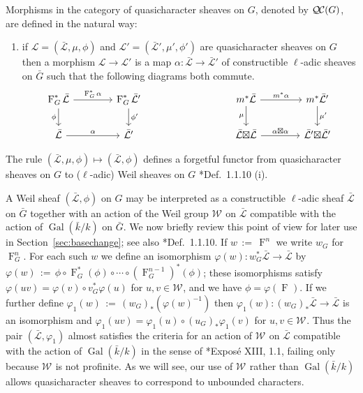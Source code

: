 \documentclass[11pt]{amsart}
\makeatletter
\theoremstyle{plain}
\theoremstyle{definition}
\theoremstyle{remark}
\newcommand{\bFq}{\bar{k}}
\newcommand{\Fq}{k}
\DeclareMathOperator{\Gal}{Gal}
\newcommand{\Frob}[1]{\operatorname{F}_{#1}}
\newcommand{\ceq}{{\, :=\, }}
\newcommand{\qcs}[1]{{\mathcal{#1}}}
\newcommand{\gqcs}[1]{{\mathcal{\bar #1}}}
\newcommand{\QC}{{\mathcal{Q\hskip-0.8pt C}}}
\newcommand{\Weil}[1]{\mathcal{W}_{#1}}
\newcommand{\labitem}[2]{%
\def\@itemlabel{\textbf{#1}}
\item
\def\@currentlabel{#1}\label{#2}}
\newcommand{\bG}{\bar{G}}
\newcommand{\tight}[3]{\hspace{-#1pt}{#2}\hspace{-#3pt}}
\newcommand{\LxL}{\text{$\gqcs{L} \tight{0}{\boxtimes}{0} \gqcs{L}$}}
\newcommand\Clifton[1]{\marginpar{\smaller\smaller CC: #1}}
\makeatother
\begin{document}
Morphisms in the category of quasicharacter sheaves on $G$, denoted by $\QC(G)$, are defined in the natural way:
\begin{enumerate}
\labitem{(QC.4)}{QC.4} if $\qcs{L} = (\gqcs{L},\mu,\phi)$ and
  $\qcs{L'} = (\gqcs{L'},\mu',\phi')$ are quasicharacter sheaves on $G$ then
  a morphism $\qcs{L} \to \qcs{L}'$ is a map $\alpha : \gqcs{L} \to \gqcs{L'}$
  of constructible $\ell$-adic sheaves on $\bG$ such that the following diagrams both commute.
  \[
  \begin{tikzcd}[column sep=40]
  \Frob{G}^* \gqcs{L} \rar{\Frob{G}^* \alpha} \arrow[swap]{d}{\phi} & \Frob{G}^* \gqcs{L'} \dar{\phi'}
  & %
  & \arrow[swap]{d}{\mu} m^* \gqcs{L} \rar{m^* \alpha} & m^* \gqcs{L'} \dar{\mu'} \\
  \gqcs{L} \rar{\alpha} & \gqcs{L'}
  & {} & \LxL \rar{\tight{1}{\alpha\boxtimes \alpha}{1}} & \gqcs{L'} \tight{0}{\boxtimes}{0} \gqcs{L'}
  \end{tikzcd}
  \]
\end{enumerate}

The rule $(\gqcs{L},\mu,\phi) \mapsto (\gqcs{L},\phi)$ defines a forgetful functor from quasicharacter
sheaves on $G$ to ($\ell$-adic) Weil sheaves on $G$ \cite{deligne:80a}*{Def.~1.1.10 (i)}.

A Weil sheaf $(\gqcs{L},\phi)$ on $G$
may be interpreted as a constructible $\ell$-adic sheaf $\gqcs{L}$ on $\bG$ together with
an action of the Weil group $\Weil{}$ on $\gqcs{L}$ compatible with the action of
$\Gal(\bFq/\Fq)$ on $\bG$. We now briefly review this point of view for later use in
Section~\ref{sec:basechange}; see also \cite{deligne:80a}*{Def.~1.1.10}.  If $w \ceq \Frob{}^n$ we write $w_G$ for $\Frob{G}^n$.
For each such $w$ we define an isomorphism $\varphi(w) : w_G^* \gqcs{L}\to \gqcs{L}$ by
$
\varphi(w) \ceq  \phi \circ \Frob{G}^*(\phi) \circ \cdots \circ (\Frob{G}^{n-1})^*(\phi)
$; 
these isomorphisms satisfy $\varphi(uv) = \varphi(v) \circ v_G^* \varphi(u)$ for $u,v\in \Weil{}$, and
we have $\phi = \varphi(\Frob{})$. 
If we further define $\varphi_1(w) \ceq (w_G)_*(\varphi(w)^{-1})$ then
$\varphi_1(w) : (w_G)_* \gqcs{L}\to \gqcs{L}$ is an isomorphism and
$\varphi_1(uv) = \varphi_1(u) \circ (u_G)_* \varphi_1(v)$ for $u,v\in \Weil{}$.
Thus the pair $(\gqcs{L},\varphi_1)$ almost satisfies the criteria for an action of $\Weil{}$
on $\gqcs{L}$ compatible with the action of $\Gal(\bFq/\Fq)$ in the sense of
\cite{deligne:SGA4.5}*{Expos\'e XIII, 1.1}, failing only because $\Weil{}$ is not profinite.
\Clifton{Improve this.}
As we will see, our use of $\Weil{}$ rather than $\Gal(\bFq/\Fq)$ allows quasicharacter sheaves to
correspond to unbounded characters.
\end{document}
